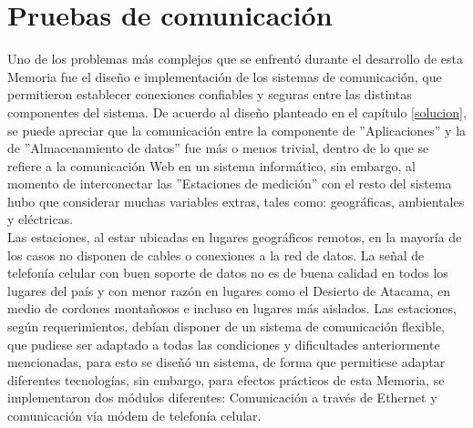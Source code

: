 \newpage
\section{Pruebas de comunicación}
Uno de los problemas más complejos que se enfrentó durante el desarrollo de esta Memoria fue el diseño e implementación de los sistemas de comunicación, que permitieron establecer conexiones confiables y seguras entre las distintas componentes del sistema. De acuerdo al diseño planteado en el capítulo \ref{solucion}, se puede apreciar que la comunicación entre la componente de ''Aplicaciones'' y la de ''Almacenamiento de datos'' fue más o menos trivial, dentro de lo que se refiere a la comunicación Web en un sistema informático, sin embargo, al momento de interconectar las ''Estaciones de medición'' con el resto del sistema hubo que considerar muchas variables extras, tales como: geográficas, ambientales y eléctricas.\\

Las estaciones, al estar ubicadas en lugares geográficos remotos, en la mayoría de los casos no disponen de cables o conexiones a la red de datos. La señal de telefonía celular con buen soporte de datos no es de buena calidad en todos los lugares del país y con menor razón en lugares como el Desierto de Atacama, en medio de cordones montañosos e incluso en lugares más aislados. Las estaciones, según requerimientos, debían disponer de un sistema de comunicación flexible, que pudiese ser adaptado a todas las condiciones y dificultades anteriormente mencionadas, para esto se diseñó un sistema, de forma que permitiese adaptar diferentes tecnologías, sin embargo, para efectos prácticos de esta Memoria, se implementaron dos módulos diferentes: Comunicación a través de Ethernet y comunicación vía módem de telefonía celular.

